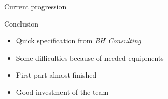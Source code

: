 \documentclass[12pt]{beamer}
\begin{document}
\begin{frame}{Current progression}
\end{frame}


\begin{frame}{Conclusion}
    \begin{itemize}
	\item<1->Quick specification from \emph{BH Consulting}
	\vfill
	\item<2->Some difficulties because of needed equipments
	\vfill
	\item<3->First part almost finished
	\vfill
	\item<4->Good investment of the team
    \end{itemize}
\end{frame}
\end{document}

